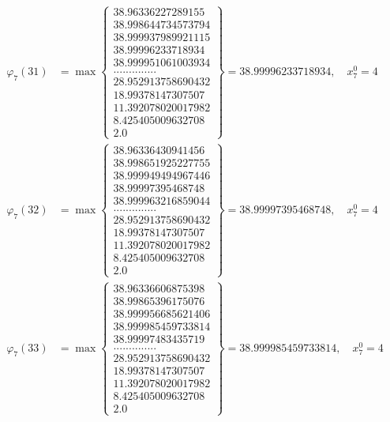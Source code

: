 \documentclass{article}
\begin{document}
\begin{align*}
  
  
  
\varphi_{7}(31) &= \max \left\{ \begin{array}{c}
38.96336227289155 \\
 38.998644734573794 \\
 38.999937989921115 \\
 38.99996233718934 \\
 38.999951061003934 \\
 .............. \\
 28.952913758690432 \\
 18.99378147307507 \\
 11.392078020017982 \\
 8.425405009632708 \\
 2.0
\end{array} \right\} = 38.99996233718934, \quad x_{7}^0 = 4\\
  
  
  
  
\varphi_{7}(32) &= \max \left\{ \begin{array}{c}
38.96336430941456 \\
 38.998651925227755 \\
 38.999949494967446 \\
 38.99997395468748 \\
 38.999963216859044 \\
 .............. \\
 28.952913758690432 \\
 18.99378147307507 \\
 11.392078020017982 \\
 8.425405009632708 \\
 2.0
\end{array} \right\} = 38.99997395468748, \quad x_{7}^0 = 4\\
  
  
  
  
\varphi_{7}(33) &= \max \left\{ \begin{array}{c}
38.96336606875398 \\
 38.99865396175076 \\
 38.999956685621406 \\
 38.999985459733814 \\
 38.99997483435719 \\
 .............. \\
 28.952913758690432 \\
 18.99378147307507 \\
 11.392078020017982 \\
 8.425405009632708 \\
 2.0
\end{array} \right\} = 38.999985459733814, \quad x_{7}^0 = 4\\
  

\end{align*}
\end{document}
